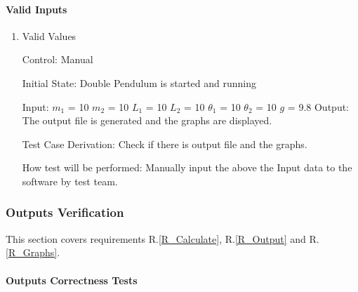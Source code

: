 \documentclass[12pt, titlepage]{article}
\begin{document}
\paragraph{Valid Inputs} 

\begin{enumerate}
          
\item{Valid Values}  

Control: Manual  
          
Initial State: Double Pendulum is started and running
          
Input: 
$m_1$ = 10
$m_2$ = 10
$L_1$ = 10
$L_2$ = 10      
$\theta_1$ = 10 
$\theta_2$ = 10
$g$ = 9.8
Output: The output file is generated and the graphs are displayed.

Test Case Derivation: Check if there is output file and the graphs. 

How test will be performed: Manually input the above the Input data to the software by test team. 

\end{enumerate}

\subsubsection{Outputs Verification}\label{VRF_Output}

This section covers requirements R.\ref{R_Calculate}, R.\ref{R_Output} and R.\ref{R_Graphs}.

\paragraph{Outputs Correctness Tests}
\end{document}
